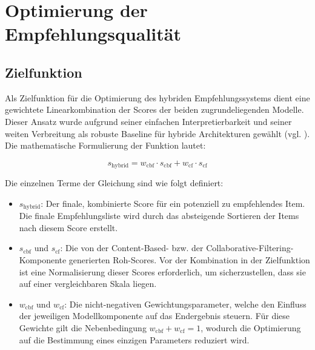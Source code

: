 \section{Optimierung der Empfehlungsqualität}


\subsection{Zielfunktion}
\label{sec:target_function}
Als Zielfunktion für die Optimierung des hybriden Empfehlungssystems dient eine gewichtete 
Linearkombination der Scores der beiden zugrundeliegenden Modelle. Dieser Ansatz wurde 
aufgrund seiner einfachen Interpretierbarkeit und seiner weiten Verbreitung als robuste 
Baseline für hybride Architekturen gewählt (vgl. \cite{burke_hybrid_2002}). 
Die mathematische Formulierung der Funktion lautet:

\begin{equation}
\label{eq:target}
s_\mathrm{hybrid} = w_\mathrm{cbf} \cdot s_\mathrm{cbf} + w_\mathrm{cf} \cdot s_\mathrm{cf}
\end{equation}

Die einzelnen Terme der Gleichung sind wie folgt definiert:
\begin{itemize}
    \item $s_\mathrm{hybrid}$: Der finale, kombinierte Score für ein potenziell zu empfehlendes Item. 
    Die finale Empfehlungsliste wird durch das absteigende Sortieren der Items nach diesem Score erstellt.
    
    \item $s_\mathrm{cbf}$ und $s_\mathrm{cf}$: Die von der Content-Based- bzw. der Collaborative-Filtering-Komponente 
    generierten Roh-Scores. Vor der Kombination in der Zielfunktion ist eine Normalisierung dieser 
    Scores erforderlich, um sicherzustellen, dass sie auf einer vergleichbaren Skala liegen.
    
    \item $w_\mathrm{cbf}$ und $w_\mathrm{cf}$: Die nicht-negativen Gewichtungsparameter, welche den Einfluss 
    der jeweiligen Modellkomponente auf das Endergebnis steuern. Für diese Gewichte gilt die Nebenbedingung 
    $w_\mathrm{cbf} + w_\mathrm{cf} = 1$, wodurch die Optimierung auf die Bestimmung eines einzigen 
    Parameters reduziert wird.
\end{itemize}

